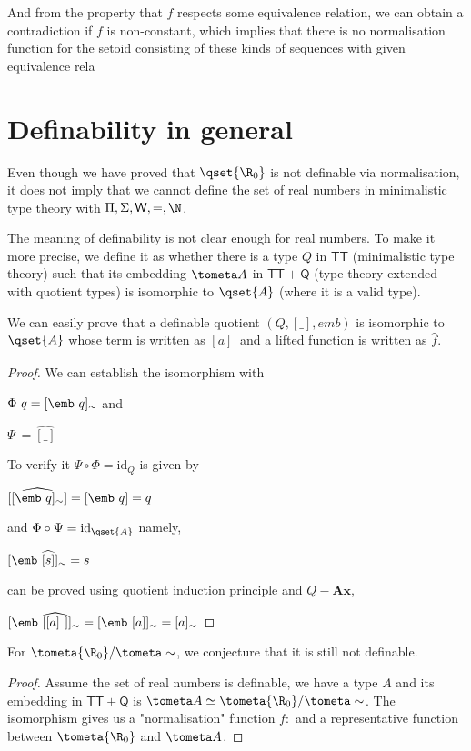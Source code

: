 And from the property that $f$ respects some equivalence relation, we can obtain a contradiction if $f$ is non-constant, which implies that there is no normalisation function for the setoid consisting of these kinds of sequences with given equivalence rela



\section{Definability in general}


Even though we have proved that $\qset{\R_0}$ is not definable via normalisation, it does not imply that we cannot define the set of real numbers in minimalistic type theory with $\Pi, \Sigma, \mathsf{W}, =,
\N$. 

The meaning of definability is not clear enough for real numbers. To make it more precise, we define
it as whether there is a type $Q$ in $\mathsf{TT}$ (minimalistic type
theory) such that its embedding $\tometa A$ in $\mathsf{TT} + \mathsf{Q}$ (type theory
extended with quotient types) is isomorphic to $\qset{A}$ (where it is a valid type). 



We can easily prove that a definable quotient $(Q, [\_], emb)$ is isomorphic to $\qset{A}$ whose term is written as $[ a ]_{~}$ and a lifted function is written as $\hat{f}$.

\begin{proof}
We can establish the isomorphism with

$\Phi ~q =  [ \emb ~q ]_{\sim}$ and 

$\Psi ~ = \widehat{[\_]}$

To verify it $\Psi \circ \Phi = \text{id}_{Q}$ is given by

$\widehat{[  [ \emb ~q ]_{\sim} ]} = [\emb ~ q] = q$

and $\Phi \circ \Psi = \text{id}_{\qset{A}}$ namely,

$[\emb~\widehat{[s]}]_{\sim} = s$

can be proved using quotient induction principle and $Q-\textbf{Ax}$,

$[\emb~\widehat{[ [a]_{~} ]}]_{\sim} = [\emb~[a]]_{\sim} = [a]_{\sim}$

\end{proof}


For $\tometa {\R_0}/ \tometa \sim$, we conjecture that it is still not
definable.

\begin{proof}
Assume the set of real numbers is definable, we have a type $A$ and
its embedding in $\mathsf{TT} + \mathsf{Q}$  is $\tometa A \simeq \tometa {\R_0}/ \tometa \sim$. The isomorphism gives us a "normalisation" function $f : $ and a representative function
between $\tometa {\R_0}$ and $\tometa A$.
\end{proof}











